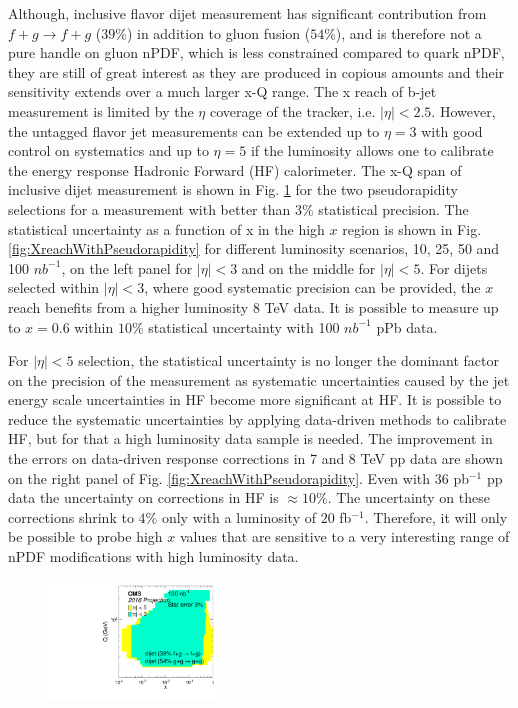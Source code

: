 Although, inclusive flavor dijet measurement has significant contribution from $f + g \rightarrow f + g$ ($39 \%$) in addition to gluon fusion ($54 \%$), and is therefore not a pure handle on gluon nPDF, which is less constrained compared to quark nPDF, they are still of great interest as they are produced in copious amounts and their sensitivity extends over a much larger x-Q range. The x reach of b-jet measurement is limited by the $\eta$ coverage of the tracker, i.e. $|\eta| < 2.5$. However, the untagged flavor jet measurements can be extended up to $\eta = 3$ with good control on systematics and up to $\eta = 5$ if the luminosity allows one to calibrate the energy response Hadronic Forward (HF) calorimeter. The x-Q span of inclusive dijet measurement is shown in Fig. \ref{fig:xQscanInclusive} for the two pseudorapidity selections for a measurement with better than $3\%$ statistical precision. The statistical uncertainty as a function of x in the high $x$ region is shown in Fig. \ref{fig:XreachWithPseudorapidity} for different luminosity scenarios, 10, 25, 50 and 100 $nb^{-1}$, on the left panel for $|\eta| < 3$ and on the middle for $|\eta| < 5$. For dijets selected within $|\eta| < 3$, where good systematic precision can be provided, the $x$ reach benefits from a higher luminosity 8 TeV data. It is possible to measure up to $x = 0.6$ within $10 \%$ statistical uncertainty with 100 $nb^{-1}$ pPb data. 

For $|\eta| < 5$ selection, the statistical uncertainty is no longer the dominant factor on the precision of the measurement as systematic uncertainties caused by the jet energy scale uncertainties in HF become more significant at HF. It is possible to reduce the systematic uncertainties by applying data-driven methods to calibrate HF, but for that a high luminosity data sample is needed. The improvement in the errors on data-driven response corrections in 7 and 8 TeV pp data are shown on the right panel of Fig. \ref{fig:XreachWithPseudorapidity}. Even with $36$ pb$^{-1}$ pp data the uncertainty on corrections in HF is $\approx 10 \%$. The uncertainty on these corrections shrink to $4\%$ only with a luminosity of $20$ fb$^{-1}$. Therefore, it will only be possible to probe high $x$ values that are sensitive to a very interesting range of nPDF modifications with high luminosity data.

\begin{figure}[h]
\begin{center}
\includegraphics[width= 0.4\textwidth]{figures/filledQX_Lumi100_InclusiveJet_etaComparison.pdf}
\caption{}
\label{fig:xQscanInclusive}
\end{center}
\end{figure}

